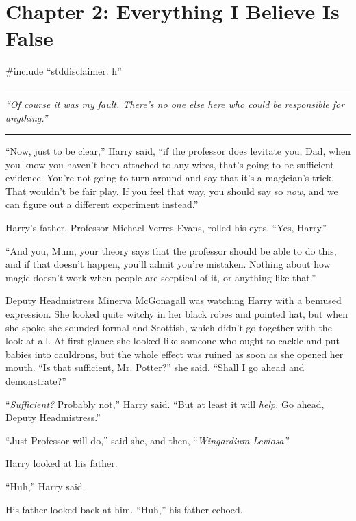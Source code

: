 \chapter{Chapter 2: Everything I Believe Is False}
\#include ``stddisclaimer. h''

\begin{center}\rule{3in}{0.4pt}\end{center}

\emph{``Of course it was my fault. There's no one else here who could be responsible for anything.''}

\begin{center}\rule{3in}{0.4pt}\end{center}

``Now, just to be clear,'' Harry said, ``if the professor does levitate you, Dad, when you know you haven't been attached to any wires, that's going to be sufficient evidence. You're not going to turn around and say that it's a magician's trick. That wouldn't be fair play. If you feel that way, you should say so \emph{now}, and we can figure out a different experiment instead.''

Harry's father, Professor Michael Verres-Evans, rolled his eyes. ``Yes, Harry.''

``And you, Mum, your theory says that the professor should be able to do this, and if that doesn't happen, you'll admit you're mistaken. Nothing about how magic doesn't work when people are sceptical of it, or anything like that.''

Deputy Headmistress Minerva McGonagall was watching Harry with a bemused expression. She looked quite witchy in her black robes and pointed hat, but when she spoke she sounded formal and Scottish, which didn't go together with the look at all. At first glance she looked like someone who ought to cackle and put babies into cauldrons, but the whole effect was ruined as soon as she opened her mouth. ``Is that sufficient, Mr. Potter?'' she said. ``Shall I go ahead and demonstrate?''

``\emph{Sufficient?} Probably not,'' Harry said. ``But at least it will \emph{help.} Go ahead, Deputy Headmistress.''

``Just Professor will do,'' said she, and then, ``\emph{Wingardium Leviosa}.''

Harry looked at his father.

``Huh,'' Harry said.

His father looked back at him. ``Huh,'' his father echoed.

